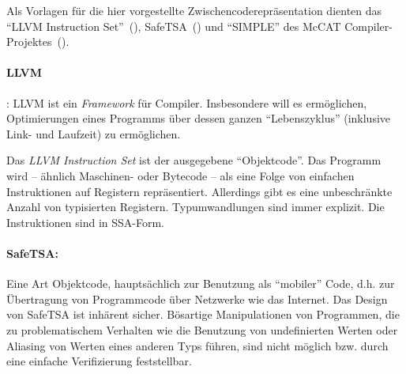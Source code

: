 \documentclass[twoside,a4paper,fleqn,12pt]{article}
\begin{document}
Als Vorlagen für die hier vorgestellte Zwischencoderepräsentation dienten das ``LLVM Instruction Set''~(\cite{LLVM:CGO04}),
SafeTSA~(\cite{SafeTSA}) und ``SIMPLE'' des McCAT Compiler-Projektes~(\cite{SIMPLE}).


\paragraph{LLVM}: LLVM ist ein \emph{Framework} für Compiler. Insbesondere will es ermöglichen, Optimierungen
eines Programms über dessen ganzen "`Lebenszyklus"' (inklusive Link- und Laufzeit) zu ermöglichen.

Das \emph{LLVM Instruction Set} ist der ausgegebene "`Objektcode"'. Das Programm wird -- ähnlich Maschinen-
oder Bytecode -- als eine Folge von einfachen Instruktionen auf Registern repräsentiert. 
Allerdings gibt es eine unbeschränkte Anzahl von typisierten Registern. Typumwandlungen sind immer explizit.
Die Instruktionen sind in SSA-Form.



\paragraph{SafeTSA:} Eine Art Objektcode, hauptsächlich zur Benutzung
als "`mobiler"' Code, d.h. zur Übertragung von Programmcode über Netzwerke wie das Internet.
Das Design von SafeTSA ist inhärent sicher. Bösartige Manipulationen von Programmen, die zu
problematischem Verhalten wie die Benutzung von undefinierten Werten oder Aliasing von Werten
eines anderen Typs führen, sind nicht möglich bzw. durch eine einfache Verifizierung feststellbar.
\end{document}
